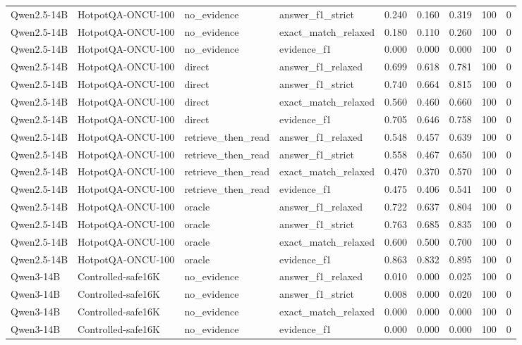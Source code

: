 \begin{tabular}{llllrrrrr}
Qwen2.5-14B & HotpotQA-ONCU-100 & no_evidence & answer_f1_strict & 0.240 & 0.160 & 0.319 & 100 & 0 \\
Qwen2.5-14B & HotpotQA-ONCU-100 & no_evidence & exact_match_relaxed & 0.180 & 0.110 & 0.260 & 100 & 0 \\
Qwen2.5-14B & HotpotQA-ONCU-100 & no_evidence & evidence_f1 & 0.000 & 0.000 & 0.000 & 100 & 0 \\
Qwen2.5-14B & HotpotQA-ONCU-100 & direct & answer_f1_relaxed & 0.699 & 0.618 & 0.781 & 100 & 0 \\
Qwen2.5-14B & HotpotQA-ONCU-100 & direct & answer_f1_strict & 0.740 & 0.664 & 0.815 & 100 & 0 \\
Qwen2.5-14B & HotpotQA-ONCU-100 & direct & exact_match_relaxed & 0.560 & 0.460 & 0.660 & 100 & 0 \\
Qwen2.5-14B & HotpotQA-ONCU-100 & direct & evidence_f1 & 0.705 & 0.646 & 0.758 & 100 & 0 \\
Qwen2.5-14B & HotpotQA-ONCU-100 & retrieve_then_read & answer_f1_relaxed & 0.548 & 0.457 & 0.639 & 100 & 0 \\
Qwen2.5-14B & HotpotQA-ONCU-100 & retrieve_then_read & answer_f1_strict & 0.558 & 0.467 & 0.650 & 100 & 0 \\
Qwen2.5-14B & HotpotQA-ONCU-100 & retrieve_then_read & exact_match_relaxed & 0.470 & 0.370 & 0.570 & 100 & 0 \\
Qwen2.5-14B & HotpotQA-ONCU-100 & retrieve_then_read & evidence_f1 & 0.475 & 0.406 & 0.541 & 100 & 0 \\
Qwen2.5-14B & HotpotQA-ONCU-100 & oracle & answer_f1_relaxed & 0.722 & 0.637 & 0.804 & 100 & 0 \\
Qwen2.5-14B & HotpotQA-ONCU-100 & oracle & answer_f1_strict & 0.763 & 0.685 & 0.835 & 100 & 0 \\
Qwen2.5-14B & HotpotQA-ONCU-100 & oracle & exact_match_relaxed & 0.600 & 0.500 & 0.700 & 100 & 0 \\
Qwen2.5-14B & HotpotQA-ONCU-100 & oracle & evidence_f1 & 0.863 & 0.832 & 0.895 & 100 & 0 \\
Qwen3-14B & Controlled-safe16K & no_evidence & answer_f1_relaxed & 0.010 & 0.000 & 0.025 & 100 & 0 \\
Qwen3-14B & Controlled-safe16K & no_evidence & answer_f1_strict & 0.008 & 0.000 & 0.020 & 100 & 0 \\
Qwen3-14B & Controlled-safe16K & no_evidence & exact_match_relaxed & 0.000 & 0.000 & 0.000 & 100 & 0 \\
Qwen3-14B & Controlled-safe16K & no_evidence & evidence_f1 & 0.000 & 0.000 & 0.000 & 100 & 0 \\

\end{tabular}
